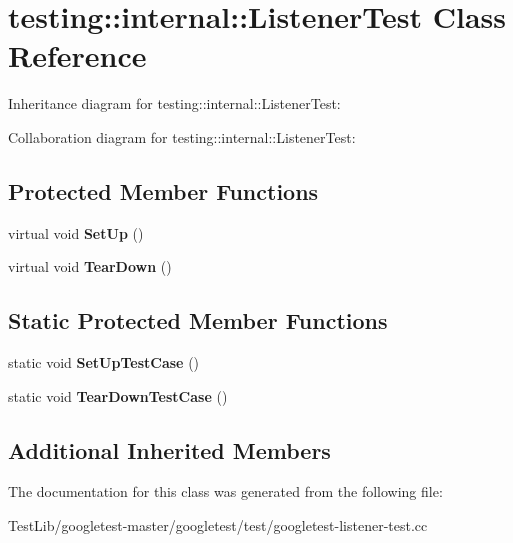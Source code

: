 \hypertarget{classtesting_1_1internal_1_1ListenerTest}{}\section{testing\+:\+:internal\+:\+:Listener\+Test Class Reference}
\label{classtesting_1_1internal_1_1ListenerTest}


Inheritance diagram for testing\+:\+:internal\+:\+:Listener\+Test\+:


Collaboration diagram for testing\+:\+:internal\+:\+:Listener\+Test\+:
\subsection*{Protected Member Functions}
\begin{DoxyCompactItemize}
\item 
\mbox{\label{classtesting_1_1internal_1_1ListenerTest_ace3dbe36b705ddf320518e6cdd919bc8}} 
virtual void {\bfseries Set\+Up} ()
\item 
\mbox{\label{classtesting_1_1internal_1_1ListenerTest_ad112535025d668e3ea14e71d8741c810}} 
virtual void {\bfseries Tear\+Down} ()
\end{DoxyCompactItemize}
\subsection*{Static Protected Member Functions}
\begin{DoxyCompactItemize}
\item 
\mbox{\label{classtesting_1_1internal_1_1ListenerTest_a7cbc298576e584b4021d0375204b7391}} 
static void {\bfseries Set\+Up\+Test\+Case} ()
\item 
\mbox{\label{classtesting_1_1internal_1_1ListenerTest_aa35b5f1c6235f0fe98aa2c7f35bb8fe1}} 
static void {\bfseries Tear\+Down\+Test\+Case} ()
\end{DoxyCompactItemize}
\subsection*{Additional Inherited Members}


The documentation for this class was generated from the following file\+:\begin{DoxyCompactItemize}
\item 
Test\+Lib/googletest-\/master/googletest/test/googletest-\/listener-\/test.\+cc\end{DoxyCompactItemize}
